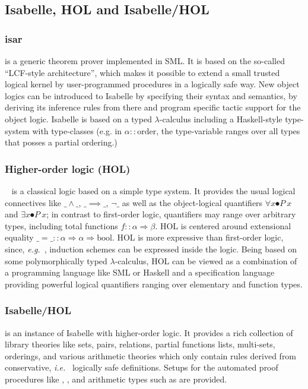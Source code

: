 \documentclass[11pt,a4paper]{article}
\newcommand{\ie}{\textit{i.e.}\ }
\newcommand{\eg}{\textit{e.g.}\ }
\begin{document}
\subsection{Isabelle, HOL and Isabelle/HOL}
\label{IsaHOL}
\subsubsection{isar} \cite{nipkow.ea:isabelle:2002} is a generic theorem prover
implemented in SML.  It is based on the so-called ``LCF-style
architecture'', which makes it possible to extend a small trusted logical
kernel by user-programmed procedures in a logically safe way. New
object logics can be introduced to Isabelle by specifying their syntax
and semantics, by deriving its inference rules from there and program specific
tactic support for the object logic. Isabelle is based on a typed $\lambda$-calculus
including a Haskell-style type-system with type-classes 
(e.g. in $\alpha::\text{order}$, the type-variable ranges over all types
that posses a partial ordering.)

\subsubsection{Higher-order logic (HOL)}~\cite{church:types:1940,andrews:introduction:2002} is a
classical logic based on a simple type system.  It provides the usual
logical connectives like $\_ \land \_$, $\_ \implies\_$, $\lnot \_ $
as well as the object-logical quantifiers $\forall x\spot P\ x$ and
$\exists x\spot P\ x$; in contrast to first-order logic, quantifiers
may range over arbitrary types, including total functions
$f :: \alpha \Rightarrow \beta$. HOL is centered around
extensional equality $\_ = \_ :: \alpha \Rightarrow \alpha
\Rightarrow \text{bool}$.  HOL is more expressive than first-order
logic, since, \eg, induction schemes can be expressed inside the
logic. Being based on some polymorphically typed $\lambda$-calculus,
HOL can be viewed as a combination of a programming language
like SML or Haskell and a specification language providing
powerful logical quantifiers ranging over elementary and function
types.

\subsubsection{Isabelle/HOL} is an instance of Isabelle with higher-order 
logic. It provides a rich collection of library theories like sets, pairs,
relations, partial functions lists, multi-sets, orderings, and various
arithmetic theories which only contain rules derived from conservative, \ie 
logically safe definitions.  Setups for the automated proof procedures like
, , and arithmetic types such as  are provided.
\end{document}
